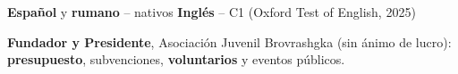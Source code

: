 \documentclass[9pt]{developercv} %
\begin{document}

\textbf{Español} y \textbf{rumano} -- nativos \quad\textbullet\quad \textbf{Inglés} -- C1 (Oxford Test of English, 2025)

\textbf{Fundador y Presidente}, Asociación Juvenil Brovrashgka (sin ánimo de lucro): \textbf{presupuesto}, subvenciones, \textbf{voluntarios} y eventos públicos.
\end{document}
